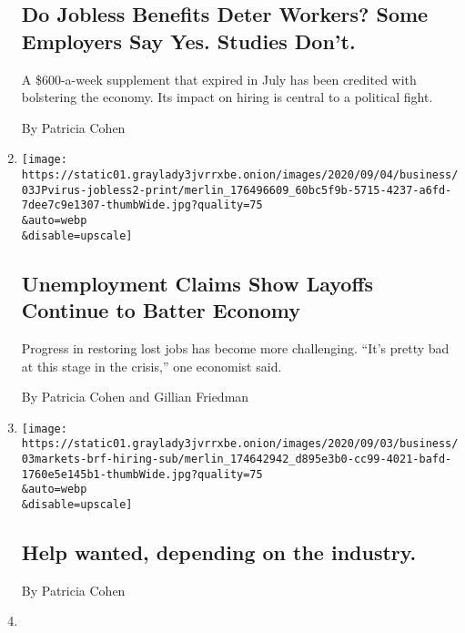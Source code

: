 \begin{enumerate}
{  \subsection{Do Jobless Benefits Deter Workers? Some Employers Say Yes.
  Studies
  Don't.}\label{do-jobless-benefits-deter-workers-some-employers-say-yes-studies-dont}}

  A \$600-a-week supplement that expired in July has been credited with
  bolstering the economy. Its impact on hiring is central to a political
  fight.

  By Patricia Cohen
\item
  \href{/2020/09/03/business/economy/unemployment-claims.html}{}

  \texttt{[image: https://static01.graylady3jvrrxbe.onion/images/2020/09/04/business/03JPvirus-jobless2-print/merlin\_176496609\_60bc5f9b-5715-4237-a6fd-7dee7c9e1307-thumbWide.jpg?quality=75\\\&auto=webp\\\&disable=upscale]}

  \hypertarget{unemployment-claims-show-layoffs-continue-to-batter-economy}{%
  \subsection{Unemployment Claims Show Layoffs Continue to Batter
  Economy}\label{unemployment-claims-show-layoffs-continue-to-batter-economy}}

  Progress in restoring lost jobs has become more challenging. ``It's
  pretty bad at this stage in the crisis,'' one economist said.

  By Patricia Cohen and Gillian Friedman
\item
  \href{/2020/09/03/business/help-wanted-depending-on-the-industry.html}{}

  \texttt{[image: https://static01.graylady3jvrrxbe.onion/images/2020/09/03/business/03markets-brf-hiring-sub/merlin\_174642942\_d895e3b0-cc99-4021-bafd-1760e5e145b1-thumbWide.jpg?quality=75\\\&auto=webp\\\&disable=upscale]}

  \hypertarget{help-wanted-depending-on-the-industry}{%
  \subsection{Help wanted, depending on the
  industry.}\label{help-wanted-depending-on-the-industry}}

  By Patricia Cohen
\item
  \href{/2020/09/03/business/after-six-months-she-hopes-unemployment-pay-is-behind-her.html}{}


\end{enumerate}
